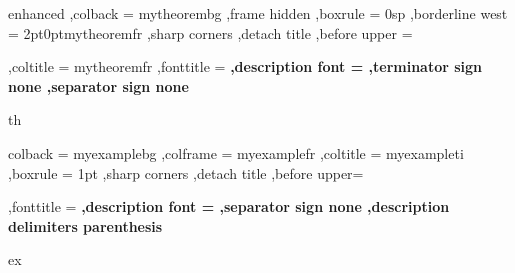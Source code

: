 \theoremstyle{remark}
\newtheorem{remark}{Remark}[section]


\usepackage{tcolorbox}

  {%
     enhanced
    ,colback = mytheorembg
    ,frame hidden
    ,boxrule = 0sp
    ,borderline west = {2pt}{0pt}{mytheoremfr}
    ,sharp corners
    ,detach title
    ,before upper = \tcbtitle\par\smallskip
    ,coltitle = mytheoremfr
    ,fonttitle = \bfseries\sffamily
    ,description font = \mdseries
    ,terminator sign none
    ,separator sign none
  }
  {th}
  {%
     colback = myexamplebg
    ,colframe = myexamplefr
    ,coltitle = myexampleti
    ,boxrule = 1pt
    ,sharp corners
    ,detach title
    ,before upper=\tcbtitle\par\smallskip
    ,fonttitle = \bfseries
    ,description font = \mdseries
    ,separator sign none
    ,description delimiters parenthesis
  }
  {ex}


\newcommand{\etal}{\text{et al.}}
\newcommand{\eg}{\text{e.g. }}
\newcommand{\cf}{\text{c.f. }}
\newcommand{\ie}{\text{i.e. }}
\newcommand{\etc}{\text{etc.}}


\newcommand{\bbA}{\mathbb{A}}
\newcommand{\bbB}{\mathbb{B}}
\newcommand{\bbC}{\mathbb{C}}
\newcommand{\bbD}{\mathbb{D}}
\newcommand{\bbE}{\mathbb{E}}
\newcommand{\bbF}{\mathbb{F}}
\newcommand{\bbG}{\mathbb{G}}
\newcommand{\bbH}{\mathbb{H}}
\newcommand{\bbI}{\mathbb{I}}
\newcommand{\bbJ}{\mathbb{J}}
\newcommand{\bbK}{\mathbb{K}}
\newcommand{\bbL}{\mathbb{L}}
\newcommand{\bbM}{\mathbb{M}}
\newcommand{\bbN}{\mathbb{N}}
\newcommand{\bbO}{\mathbb{O}}
\newcommand{\bbP}{\mathbb{P}}
\newcommand{\bbQ}{\mathbb{Q}}
\newcommand{\bbR}{\mathbb{R}}
\newcommand{\bbS}{\mathbb{S}}
\newcommand{\bbT}{\mathbb{T}}
\newcommand{\bbU}{\mathbb{U}}
\newcommand{\bbV}{\mathbb{V}}
\newcommand{\bbW}{\mathbb{W}}
\newcommand{\bbX}{\mathbb{X}}
\newcommand{\bbY}{\mathbb{Y}}
\newcommand{\bbZ}{\mathbb{Z}}

